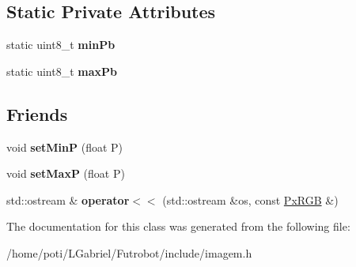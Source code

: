 \subsection*{Static Private Attributes}
\begin{DoxyCompactItemize}
\item 
static uint8\+\_\+t {\bfseries min\+Pb}\hypertarget{classPxRGB_a019f52c2613c377f20fb5b40bdfff790}{}\label{classPxRGB_a019f52c2613c377f20fb5b40bdfff790}

\item 
static uint8\+\_\+t {\bfseries max\+Pb}\hypertarget{classPxRGB_a258369deaab4a6a7cfd7c6d09b466e81}{}\label{classPxRGB_a258369deaab4a6a7cfd7c6d09b466e81}

\end{DoxyCompactItemize}
\subsection*{Friends}
\begin{DoxyCompactItemize}
\item 
void {\bfseries set\+MinP} (float P)\hypertarget{classPxRGB_a25e568a929b80c74224244a94d6974b5}{}\label{classPxRGB_a25e568a929b80c74224244a94d6974b5}

\item 
void {\bfseries set\+MaxP} (float P)\hypertarget{classPxRGB_aee1927a74b640a1d7b0cc9bbe654b185}{}\label{classPxRGB_aee1927a74b640a1d7b0cc9bbe654b185}

\item 
std\+::ostream \& {\bfseries operator$<$$<$} (std\+::ostream \&os, const \hyperlink{classPxRGB}{Px\+R\+GB} \&)\hypertarget{classPxRGB_ac0063d0bf2a89c44bd73c8e9adb5b09f}{}\label{classPxRGB_ac0063d0bf2a89c44bd73c8e9adb5b09f}

\end{DoxyCompactItemize}


The documentation for this class was generated from the following file\+:\begin{DoxyCompactItemize}
\item 
/home/poti/\+L\+Gabriel/\+Futrobot/include/imagem.\+h\end{DoxyCompactItemize}
